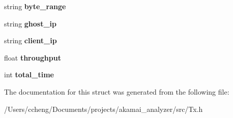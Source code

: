 \begin{DoxyCompactItemize}
\item 
\mbox{\label{struct_tx_ab25e8628ee0d7b707193eff708f2bc31}} 
string {\bfseries byte\+\_\+range}
\item 
\mbox{\label{struct_tx_a0417366565b08f605194bba01cff1a5c}} 
string {\bfseries ghost\+\_\+ip}
\item 
\mbox{\label{struct_tx_a2f5439a7da3cda247c552c29194f3a03}} 
string {\bfseries client\+\_\+ip}
\item 
\mbox{\label{struct_tx_a22db30e541cdeeb5a0f1f94f81e3c12a}} 
float {\bfseries throughput}
\item 
\mbox{\label{struct_tx_afa329a8b60db10c0c2f269432c457870}} 
int {\bfseries total\+\_\+time}
\end{DoxyCompactItemize}


The documentation for this struct was generated from the following file\+:\begin{DoxyCompactItemize}
\item 
/\+Users/ccheng/\+Documents/projects/akamai\+\_\+analyzer/src/Tx.\+h\end{DoxyCompactItemize}
